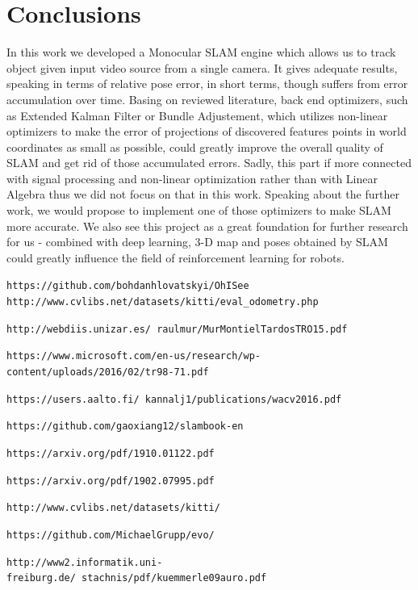 \section{Conclusions}
In this work we developed a Monocular SLAM engine which allows us to track object given input video source from a single camera. It gives adequate results, speaking in terms of relative pose error, in short terms, though suffers from error accumulation over time. Basing on reviewed literature, back end optimizers, such as Extended Kalman Filter or Bundle Adjustement, which utilizes non-linear optimizers to make the error of projections of discovered features points in world coordinates as small as possible, could greatly improve the overall quality of SLAM and get rid of those accumulated errors. Sadly, this part if more connected with signal processing and non-linear optimization rather than with Linear Algebra thus we did not focus on that in this work. Speaking about the further work, we would propose to implement one of those optimizers to make SLAM more accurate. We also see this project as a great foundation for further research for us - combined with deep learning, 3-D map and poses obtained by SLAM could greatly influence the field of reinforcement learning for robots. 


\pagebreak
\appendix
\begin{thebibliography}{10}

 \texttt{https://github.com/bohdanhlovatskyi/OhISee}
 \texttt{http://www.cvlibs.net/datasets/kitti/eval_odometry.php}

 \texttt{http://webdiis.unizar.es/~raulmur/MurMontielTardosTRO15.pdf}

 \texttt{https://www.microsoft.com/en-us/research/wp-content/uploads/2016/02/tr98-71.pdf} 

 \texttt{https://users.aalto.fi/~kannalj1/publications/wacv2016.pdf}

 \texttt{https://github.com/gaoxiang12/slambook-en}

 \texttt{https://arxiv.org/pdf/1910.01122.pdf}

 \texttt{https://arxiv.org/pdf/1902.07995.pdf}

\texttt{http://www.cvlibs.net/datasets/kitti/}

\texttt{https://github.com/MichaelGrupp/evo/}

\texttt{http://www2.informatik.uni-freiburg.de/~stachnis/pdf/kuemmerle09auro.pdf}

\end{thebibliography}



